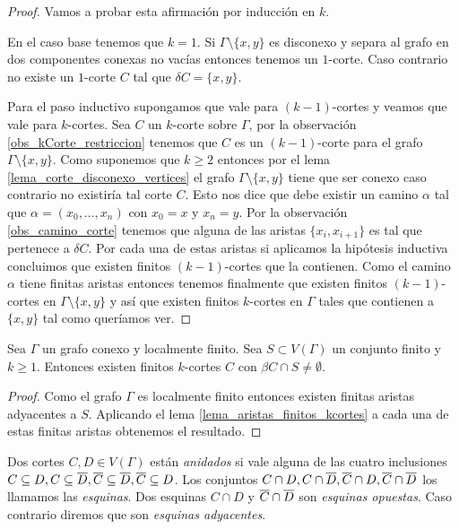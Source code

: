 \documentclass[tesis.tex]{subfiles}
\begin{document}
\begin{proof}
	Vamos a probar esta afirmación por inducción en $k$.
	
	En el caso base tenemos que $k=1$. 
	Si $\Gamma \setminus \{x,y\}$ es disconexo y separa al grafo en dos componentes conexas no vacías entonces tenemos un $1$-corte. 
	Caso contrario no existe un $1$-corte $C$ tal que $\delta C = \{x,y\}$.
	
	Para el paso inductivo supongamos que vale para $(k-1)$-cortes y veamos que vale para $k$-cortes.
	Sea $C$ un $k$-corte sobre $\Gamma$, por la observación \ref{obs_kCorte_restriccion} tenemos que $C$ es un $(k-1)$-corte para el grafo $\Gamma \setminus \{x,y\}$.
	Como suponemos que $k \ge 2$ entonces por el lema \ref{lema_corte_disconexo_vertices} el grafo $\Gamma \setminus \{x,y\}$ tiene que ser conexo caso contrario no existiría tal corte $C$.
	Esto nos dice que debe existir un camino $\alpha$ tal que $\alpha = (x_{0}, \dots, x_{n})$ con $x_{0} = x$ y $x_{n} = y$.
	Por la observación \ref{obs_camino_corte} tenemos que alguna de las aristas $\{x_{i},x_{i+1}\}$ es tal que pertenece a $\delta C$.
	Por cada una de estas aristas si aplicamos la hipótesis inductiva concluimos que existen finitos $(k-1)$-cortes que la contienen.
	Como el camino $\alpha$ tiene finitas aristas entonces tenemos finalmente que existen finitos $(k-1)$-cortes en $\Gamma \setminus \{x,y\}$ y así que existen finitos $k$-cortes en $\Gamma$ tales que contienen a $\{x,y\}$ tal como queríamos ver.
	
\end{proof}




\begin{coro}\label{lema_finitos_kcortes}
	Sea $\Gamma$ un grafo conexo y localmente finito.
	Sea $S \subset V(\Gamma)$ un conjunto finito y $k\ge 1$.
	Entonces existen finitos $k$-cortes $C$ con $\beta C \cap S \neq \emptyset$.
\end{coro}	

\begin{proof}
	Como el grafo $\Gamma$ es localmente finito entonces existen finitas aristas adyacentes a $S$.
	Aplicando el lema \ref{lema_aristas_finitos_kcortes} a cada una de estas finitas aristas obtenemos el resultado.	
\end{proof}
	





\begin{deff}
	Dos cortes $C,D \in V(\Gamma)$ están \emph{anidados} si vale alguna de las cuatro inclusiones $C \subseteq D, C \subseteq \overline D, \overline C \subseteq \overline D, \overline C \subseteq D$.
	Los conjuntos $C \cap D, C \cap \overline D, \overline C \cap D, \overline C \cap \overline D$ los llamamos las \emph{esquinas}.
	Dos esquinas $C \cap D$ y $\overline C \cap \overline D$ son \emph{esquinas opuestas}.
	Caso contrario diremos que son \emph{esquinas adyacentes}.
\end{deff}
\end{document}
